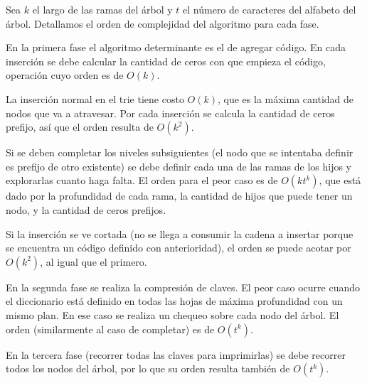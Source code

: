 Sea $k$ el largo de las ramas del árbol y $t$ el número de caracteres del
alfabeto del árbol. Detallamos el orden de complejidad del algoritmo para cada fase.

En la primera fase el algoritmo determinante es el de agregar código. En cada
inserción se debe calcular la cantidad de ceros con que empieza el
código, operación cuyo orden es de $O(k)$.

La inserción normal en el trie tiene costo $O(k)$, que es la máxima cantidad
de nodos que va a atravesar. Por cada inserción se calcula la cantidad de
ceros prefijo, así que el orden resulta de $O(k^2)$.

Si se deben completar los niveles subsiguientes (el nodo que se intentaba
definir es prefijo de otro existente) se debe definir cada una de las ramas
de los hijos y explorarlas cuanto haga falta. El orden para el peor caso es
de $O(kt^k)$, que está dado por la profundidad de cada rama, la cantidad
de hijos que puede tener un nodo, y la cantidad de ceros prefijos.

Si la inserción se ve cortada (no se llega a consumir la cadena a insertar
porque se encuentra un código definido con anterioridad), el orden se puede
acotar por $O(k^2)$, al igual que el primero.

En la segunda fase se realiza la compresión de claves. El peor caso ocurre
cuando el diccionario está definido en todas las hojas de máxima profundidad
con un mismo plan. En ese caso se realiza un chequeo sobre cada nodo del árbol.
El orden (similarmente al caso de completar) es de $O(t^k)$.

En la tercera fase (recorrer todas las claves para imprimirlas) se debe
recorrer todos los nodos del árbol, por lo que su orden resulta también de
$O(t^k)$.

